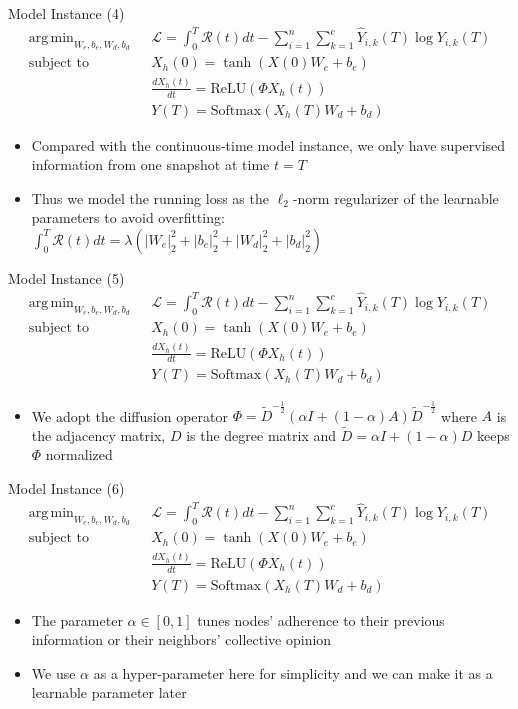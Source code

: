 \documentclass{beamer}
\DeclareMathOperator*{\argmin}{arg\,min}
\begin{document}
\begin{frame}{Model Instance (4)}\[
\begin{split}
\argmin_{W_e,b_e,W_d,b_d}\text{ }&\mathcal{L}=\int_0^T\mathcal{R}(t)dt-\sum_{i=1}^n\sum_{k=1}^c\hat{Y}_{i,k}(T)\log Y_{i,k}(T)\\
\text{subject to }&X_h(0)=\tanh(X(0)W_e+b_e)\\
&\frac{dX_h(t)}{dt}=\text{ReLU}(\Phi X_h(t))\\
&Y(T)=\text{Softmax}(X_h(T)W_d+b_d)
\end{split}
\]
\begin{itemize}
\item Compared with the continuous-time model instance, we only have supervised information from one snapshot at time $t=T$
\item Thus we model the running loss as the $\ell_2$-norm regularizer of the learnable parameters to avoid overfitting: $\int_0^T\mathcal{R}(t)dt=\lambda(|W_e|_2^2+|b_e|_2^2+|W_d|_2^2+|b_d|_2^2)$
\end{itemize}
\end{frame}


\begin{frame}{Model Instance (5)}\[
\begin{split}
\argmin_{W_e,b_e,W_d,b_d}\text{ }&\mathcal{L}=\int_0^T\mathcal{R}(t)dt-\sum_{i=1}^n\sum_{k=1}^c\hat{Y}_{i,k}(T)\log Y_{i,k}(T)\\
\text{subject to }&X_h(0)=\tanh(X(0)W_e+b_e)\\
&\frac{dX_h(t)}{dt}=\text{ReLU}(\Phi X_h(t))\\
&Y(T)=\text{Softmax}(X_h(T)W_d+b_d)
\end{split}
\]
\begin{itemize}
\item We adopt the diffusion operator $\Phi=\tilde{D}^{-\frac{1}{2}}(\alpha I+(1-\alpha)A)\tilde{D}^{-\frac{1}{2}}$ where $A$ is the adjacency matrix, $D$ is the degree matrix and $\tilde{D}=\alpha I+(1-\alpha)D$ keeps $\Phi$ normalized
\end{itemize}
\end{frame}


\begin{frame}{Model Instance (6)}\[
\begin{split}
\argmin_{W_e,b_e,W_d,b_d}\text{ }&\mathcal{L}=\int_0^T\mathcal{R}(t)dt-\sum_{i=1}^n\sum_{k=1}^c\hat{Y}_{i,k}(T)\log Y_{i,k}(T)\\
\text{subject to }&X_h(0)=\tanh(X(0)W_e+b_e)\\
&\frac{dX_h(t)}{dt}=\text{ReLU}(\Phi X_h(t))\\
&Y(T)=\text{Softmax}(X_h(T)W_d+b_d)
\end{split}
\]
\begin{itemize}
\item The parameter $\alpha\in[0,1]$ tunes nodes' adherence to their previous information or their neighbors' collective opinion
\item We use $\alpha$ as a hyper-parameter here for simplicity and we can make it as a learnable parameter later
\end{itemize}
\end{frame}
\end{document}
